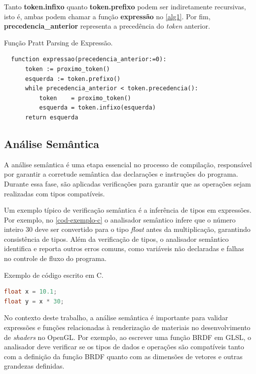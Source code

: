 \documentclass[english, 
               brazil, 
               bsc] %
               {dcomp-abntex2}
\begin{document}
Tanto \textbf{token.infixo} quanto \textbf{token.prefixo} podem ser indiretamente recursivas, isto é, ambas podem chamar a função \textbf{expressão} no \autoref{alg1}. 
Por fim, \textbf{precedencia\_anterior} representa a precedência do \textit{token} anterior.


\begin{algoritmo}[H]
        \caption{\small Função Pratt Parsing de Expressão.}
        \label{alg1}
  \begin{lstlisting}
  function expressao(precedencia_anterior:=0):
      token := proximo_token()
      esquerda := token.prefixo()
      while precedencia_anterior < token.precedencia():
          token    = proximo_token()
          esquerda = token.infixo(esquerda)
      return esquerda
  \end{lstlisting}
\end{algoritmo}


\subsection{Análise Semântica}


A análise semântica é uma etapa essencial no processo de compilação, responsável por garantir a corretude semântica das declarações e instruções do programa. Durante essa fase, são aplicadas verificações para garantir que as operações sejam realizadas com tipos compatíveis.


Um exemplo típico de verificação semântica é a inferência de tipos em expressões. Por exemplo, no \autoref{cod-exemplo-c} o analisador semântico infere que o número inteiro $30$ deve ser convertido para o tipo \textit{float} antes da multiplicação, garantindo consistência de tipos. Além da verificação de tipos, o analisador semântico identifica e reporta outros erros comuns, como variáveis não declaradas e falhas no controle de fluxo do programa.


\begin{codigo}
\caption{\small Exemplo de código escrito em C.}
  \label{cod-exemplo-c}
\begin{lstlisting}[language=C]
float x = 10.1;
float y = x * 30;
\end{lstlisting}
\end{codigo}



No contexto deste trabalho, a análise semântica é importante para validar expressões e funções relacionadas à renderização de materiais no desenvolvimento de \textit{shaders} no OpenGL. Por exemplo, ao escrever uma função BRDF em GLSL, o analisador deve verificar se os tipos de dados e operações são compatíveis tanto com a definição da função BRDF quanto com as dimensões de vetores e outras grandezas definidas.
\end{document}
